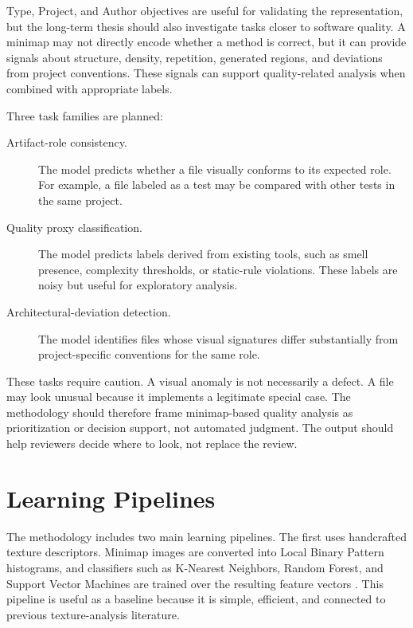 Type, Project, and Author objectives are useful for validating the
representation, but the long-term thesis should also investigate tasks closer to
software quality. A minimap may not directly encode whether a method is correct,
but it can provide signals about structure, density, repetition, generated
regions, and deviations from project conventions. These signals can support
quality-related analysis when combined with appropriate labels.

Three task families are planned:

\begin{description}
    \item[Artifact-role consistency.] The model predicts whether a file visually
    conforms to its expected role. For example, a file labeled as a test may be
    compared with other tests in the same project.

    \item[Quality proxy classification.] The model predicts labels derived from
    existing tools, such as smell presence, complexity thresholds, or static-rule
    violations. These labels are noisy but useful for exploratory analysis.

    \item[Architectural-deviation detection.] The model identifies files whose
    visual signatures differ substantially from project-specific conventions for
    the same role.
\end{description}

These tasks require caution. A visual anomaly is not necessarily a defect. A
file may look unusual because it implements a legitimate special case. The
methodology should therefore frame minimap-based quality analysis as
prioritization or decision support, not automated judgment. The output should
help reviewers decide where to look, not replace the review.

\section{Learning Pipelines}

The methodology includes two main learning pipelines. The first uses
handcrafted texture descriptors. Minimap images are converted into Local Binary
Pattern histograms, and classifiers such as K-Nearest Neighbors, Random Forest,
and Support Vector Machines are trained over the resulting feature vectors
\cite{gebara2025iwssip}. This pipeline is useful as a baseline because it is
simple, efficient, and connected to previous texture-analysis literature.

